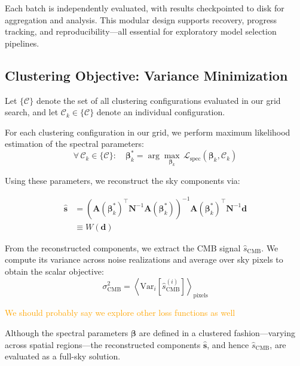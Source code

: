 \documentclass[fleqn,usenatbib]{mnras}
\newcommand{\je}[1]{\textcolor{orange}{#1}}
\begin{document}
Each batch is independently evaluated, with results checkpointed to disk for aggregation and analysis. This modular design supports recovery, progress tracking, and reproducibility—all essential for exploratory model selection pipelines.
\subsection{Clustering Objective: Variance Minimization}
\label{subsec:variance_minimization}

Let \(\{\mathcal{C}\}\) denote the set of all clustering configurations evaluated in our grid search, and let \(\mathcal{C}_k \in \{\mathcal{C}\}\) denote an individual configuration.

For each clustering configuration in our grid, we perform maximum likelihood estimation of the spectral parameters:
\begin{equation}
\label{eq:grid_search}
\forall\, \mathcal{C}_k \in \{\mathcal{C}\} : \quad \boldsymbol{\beta}_k^* = \arg \max_{\boldsymbol{\beta}_k} \, \mathcal{L}_{\mathrm{spec}}(\boldsymbol{\beta}_k, \mathcal{C}_k)
\end{equation}

Using these parameters, we reconstruct the sky components via:


\begin{align}
\hat{\mathbf{s}} &= \left( \mathbf{A}(\boldsymbol{\beta}_k^*)^\top \mathbf{N}^{-1} \mathbf{A}(\boldsymbol{\beta}_k^*) \right)^{-1} \mathbf{A}(\boldsymbol{\beta}_k^*)^\top \mathbf{N}^{-1} \mathbf{d} \label{eq:recon_operator} \\
                 &\equiv W(\mathbf{d})
\end{align}

From the reconstructed components, we extract the CMB signal \( \hat{s}_{\mathrm{CMB}} \). We compute its variance across noise realizations and average over sky pixels to obtain the scalar objective:
\begin{equation}
\label{eq:min_var}
    \sigma^2_{\mathrm{CMB}} = \left\langle \mathrm{Var}_{i} \left[ \hat{s}^{(i)}_{\mathrm{CMB}} \right] \right\rangle_{\text{pixels}}
\end{equation}

\je{We should probably say we explore other loss functions as well}

Although the spectral parameters \( \boldsymbol{\beta} \) are defined in a clustered fashion—varying across spatial regions—the reconstructed components \( \hat{\mathbf{s}} \), and hence \( \hat{s}_{\mathrm{CMB}} \), are evaluated as a full-sky solution.
\end{document}
